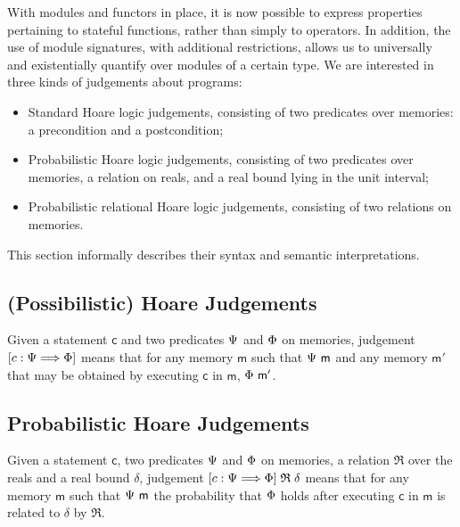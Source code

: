 With modules and functors in place, it is now possible to express properties
pertaining to stateful functions, rather than simply to operators. In addition,
the use of module signatures, with additional restrictions, allows us to
universally and existentially quantify over modules of a certain type. We are
interested in three kinds of judgements about programs:
\begin{itemize}\itemsep-.5em
\item Standard Hoare logic judgements, consisting of two predicates over
  memories: a precondition and a postcondition;
\item Probabilistic Hoare logic judgements, consisting of two predicates over
  memories, a relation on reals, and a real bound lying in the unit interval;
\item Probabilistic relational Hoare logic judgements, consisting of two
  relations on memories.
\end{itemize}
This section informally describes their syntax and semantic interpretations.


\subsection{(Possibilistic) Hoare Judgements}
Given a statement $\mathsf{c}$ and two predicates $\Psi$ and $\Phi$ on
memories, judgement $\left[{c}:{\Psi}\Longrightarrow{\Phi}\right]$ means that for any memory
$\mathsf{m}$ such that $\Psi\ \mathsf{m}$ and any memory $\mathsf{m'}$ that may
be obtained by executing $\mathsf{c}$ in $\mathsf{m}$, $\Phi\ \mathsf{m'}$.


\subsection{Probabilistic Hoare Judgements}
Given a statement $\mathsf{c}$, two predicates $\Psi$ and $\Phi$ on
memories, a relation $\mathfrak{R}$ over the reals and a real bound $\delta$,
judgement $\left[{c}:{\Psi}\Longrightarrow{\Phi}\right] \mathrel{\mathfrak{R}} \delta$ means that for
any memory $\mathsf{m}$ such that $\Psi\ \mathsf{m}$ the probability that
$\Phi$ holds after executing $\mathsf{c}$ in $\mathsf{m}$ is related to
$\delta$ by $\mathfrak{R}$.



